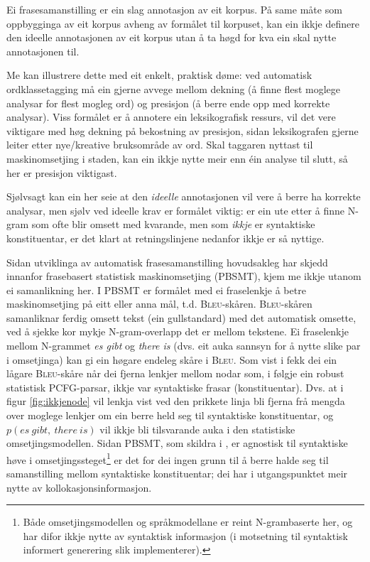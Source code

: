 \documentclass[11pt,a4paper,oneside,draft]{book}
\newcommand{\Bleu}{\textsc{Bleu}}
\begin{document}
\label{SEC:formaal}

Ei frasesamanstilling er ein slag annotasjon av eit korpus. På same
måte som oppbygginga av eit korpus avheng av formålet til korpuset,
kan ein ikkje definere den ideelle annotasjonen av eit korpus utan å
ta høgd for kva ein skal nytte annotasjonen til.

Me kan illustrere dette med eit enkelt, praktisk døme: ved automatisk
ordklassetagging må ein gjerne avvege mellom dekning (å finne flest
moglege analysar for flest mogleg ord) og presisjon (å berre ende opp
med korrekte analysar).  Viss formålet er å annotere ein
leksikografisk ressurs, vil det vere viktigare med høg dekning på
bekostning av presisjon, sidan leksikografen gjerne leiter etter
nye/kreative bruksområde av ord. Skal taggaren nyttast til
maskinomsetjing i staden, kan ein ikkje nytte meir enn éin analyse til
slutt, så her er presisjon viktigast.

Sjølvsagt kan ein her seie at den \emph{ideelle} annotasjonen vil vere å
berre ha korrekte analysar, men sjølv ved ideelle krav er formålet
viktig: er ein ute etter å finne N-gram som ofte blir omsett med
kvarande, men som \emph{ikkje} er syntaktiske konstituentar, er det klart
at retningslinjene nedanfor ikkje er så nyttige.

Sidan utviklinga av automatisk frasesamanstilling hovudsakleg har
skjedd innanfor frasebasert statistisk maskinomsetjing (PBSMT), kjem
me ikkje utanom ei samanlikning her. I PBSMT er formålet med ei
fraselenkje å betre maskinomsetjing på eitt eller anna mål,
t.d. \Bleu-skåren. \Bleu-skåren samanliknar ferdig omsett tekst (ein
gullstandard) med det automatisk omsette, ved å sjekke kor mykje
N-gram-overlapp det er mellom tekstene. Ei fraselenkje mellom
N-grammet \emph{es gibt} og \emph{there is} (dvs. eit auka sannsyn for å nytte
slike par i omsetjinga) kan gi ein høgare endeleg skåre i \Bleu. Som
vist i \citet{koehn2003spb} fekk dei ein lågare \Bleu-skåre når dei
  fjerna lenkjer mellom nodar som, i følgje ein robust
statistisk PCFG-parsar, ikkje var syntaktiske frasar
(konstituentar). Dvs. at i figur \ref{fig:ikkjenode} vil lenkja vist
ved den prikkete linja bli fjerna frå mengda over moglege lenkjer om
ein berre held seg til syntaktiske konstituentar, og
$p(es~gibt,~there~is)$ vil ikkje bli tilsvarande auka i den
statistiske omsetjingsmodellen. Sidan PBSMT, som skildra i
\citet{koehn2003spb}, er agnostisk til syntaktiske høve i
omsetjingssteget\footnote{Både omsetjingsmodellen og språkmodellane er reint
      N-grambaserte her, og har difor ikkje nytte av syntaktisk
      informasjon (i motsetning til syntaktisk informert generering
      slik \citet{riezler2006gmt} implementerer). } er det for dei ingen grunn til å berre halde
seg til samanstilling mellom syntaktiske konstituentar; dei har i
utgangspunktet meir nytte av kollokasjonsinformasjon.
\end{document}
